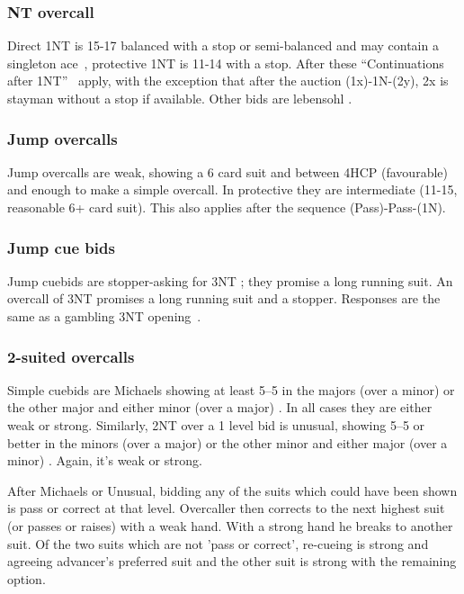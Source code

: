 \documentclass[a4paper,14pt]{extarticle}
\begin{document}
\subsubsection{NT overcall}
Direct 1NT is 15-17 balanced with a stop or semi-balanced and may contain a
singleton ace~, protective 1NT is 11-14 with a stop.  After these
``Continuations after 1NT''~ apply, with the exception that
after the auction (1x)-1N-(2y), 2x is stayman without a stop if available.
Other bids are lebensohl .

\subsubsection{Jump overcalls}
Jump overcalls are weak, showing a 6 card suit and between 4HCP (favourable)
and enough to make a simple overcall. In protective they are intermediate
(11-15, reasonable 6+ card suit). This also applies after the sequence (Pass)-Pass-(1N).

\subsubsection{Jump cue bids}
Jump cuebids are stopper-asking for 3NT ; they promise a long
running suit.  An overcall of 3NT promises a long running suit and a stopper.
Responses are the same as a gambling 3NT opening~.

\subsubsection{2-suited overcalls}

Simple cuebids are Michaels showing at least 5--5 in the majors (over a minor)
or the other major and either minor (over a major) . In all cases they are
either weak or strong. Similarly, 2NT over a 1 level bid is unusual, showing
5--5 or better in the minors (over a major) or the other minor and either major
(over a minor) . Again, it's weak or strong.

After Michaels or Unusual, bidding any of the suits which could have been shown
is pass or correct at that level. Overcaller then corrects to the next highest
suit (or passes or raises) with a weak hand. With a strong hand he breaks to
another suit. Of the two suits which are not 'pass or correct', re-cueing is
strong and agreeing advancer's preferred suit and the other suit is strong with
the remaining option.
\end{document}
